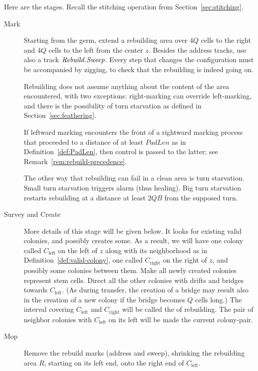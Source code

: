 \documentclass[11pt]{memoir}
\theoremstyle{definition} %
\newcommand{\fld}[1]{\ensuremath{\textit{#1\/}}}
\def\B{B}
\newcommand{\Q}{Q} %
\newcommand{\z}{z} %
\newcommand{\PadLen}{\mathit{PadLen}} %
\newcommand{\Left}{\text{left}}
\newcommand{\Right}{\text{right}}
\newcommand{\Rebuild}{\fld{Rebuild}} %
\newcommand{\Sweep}{\fld{Sweep}} %
\begin{document}
Here are the stages.
Recall the stitching operation from Section~\ref{sec:stitching}.
\begin{description}
 \item[Mark] Starting from the germ, extend a rebuilding area  over \( 4\Q \) cells to the right
and \( 4\Q \) cells to the left from the center \( \z \).
Besides the address tracks, use also a track \( \Rebuild.\Sweep \).
Every step that changes the configuration must be accompanied by zigging, to check that
the rebuilding is indeed going on.

Rebuilding does not assume anything about the content of the area encountered, with
two exceptions: right-marking can override left-marking, and
there is the possibility of turn starvation as defined in Section~\ref{sec:feathering}.

If leftward marking encounters the front of a rightward marking 
process that proceeded to a distance of at least \( \PadLen \) as in Definition~\ref{def:PadLen},
then control is passed to the latter; see Remark~\ref{rem:rebuild-precedence}.

The other way that rebuilding can fail in a clean area is turn starvation.
Small turn starvation triggers alarm (thus healing).
Big turn starvation restarts rebuilding at a distance at least  \( 2\Q\B \) from the supposed turn.

 \item[Survey and Create]
More details of this stage will be given below.
It looks for existing valid colonies, and possibly creates some.
As a result, we will have one colony called \( C_{\Left} \)
on the left of \( z \) along with its neighborhood as in Definition~\ref{def:valid-colony},
one called \( C_{\Right} \) on the right of \( z \), and possibly some colonies between them.
Make all newly created colonies represent stem cells.
Direct all the other colonies with drifts and bridges towards \( C_{\Left} \).
(As during transfer, the creation of a bridge may result also in the creation of a new 
colony if the bridge becomes \( \Q \) cells long.)
The interval covering \( C_{\Left} \) and \( C_{\Right} \)
will be called the  of rebuilding.
The pair of neighbor colonies with \( C_{\Left} \) on its left will be made the current colony-pair.

\item[Mop] Remove the rebuild marks (address and sweep),
  shrinking the rebuilding area \( R \), starting on its left end,
  onto the right end of \( C_{\Left} \).



  
\end{description}
\end{document}
